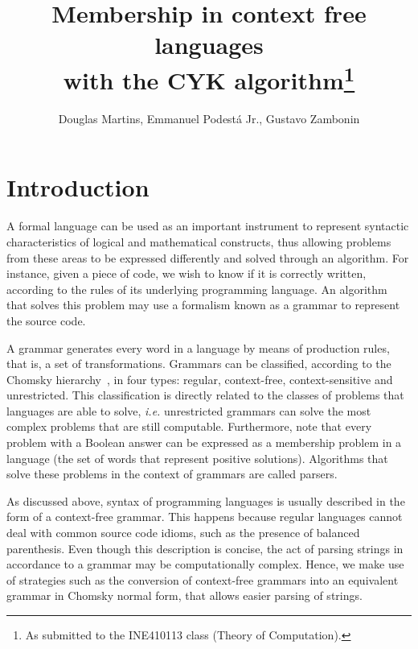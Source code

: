 \documentclass[12pt]{article}
\title{Membership in context free languages \\ with the CYK algorithm\footnote{
    As submitted to the INE410113 class (Theory of Computation).}}
\author{Douglas Martins\inst{1}, Emmanuel Podestá Jr.\inst{1}, Gustavo Zambonin\inst{1}}
\begin{document}
 

\maketitle

\section{Introduction}\label{sec:intro}
A formal language can be used as an important instrument to represent syntactic characteristics of logical and mathematical constructs, thus allowing problems from these areas to be expressed differently and solved through an algorithm. For instance, given a piece of code, we wish to know if it is correctly written, according to the rules of its underlying programming language. An algorithm that solves this problem may use a formalism known as a grammar to represent the source code.

A grammar generates every word in a language by means of production rules, that is, a set of transformations. Grammars can be classified, according to the Chomsky hierarchy~\cite{}, in four types: regular, context-free, context-sensitive and unrestricted. This classification is directly related to the classes of problems that languages are able to solve, \emph{i.e.} unrestricted grammars can solve the most complex problems that are still computable. Furthermore, note that every problem with a Boolean answer can be expressed as a membership problem in a language (the set of words that represent positive solutions). Algorithms that solve these problems in the context of grammars are called parsers.

As discussed above, syntax of programming languages is usually described in the form of a context-free grammar. This happens because regular languages cannot deal with common source code idioms, such as the presence of balanced parenthesis. Even though this description is concise, the act of parsing strings in accordance to a grammar may be computationally complex. Hence, we make use of strategies such as the conversion of context-free grammars into an equivalent grammar in Chomsky normal form, that allows easier parsing of strings.



\end{document}

